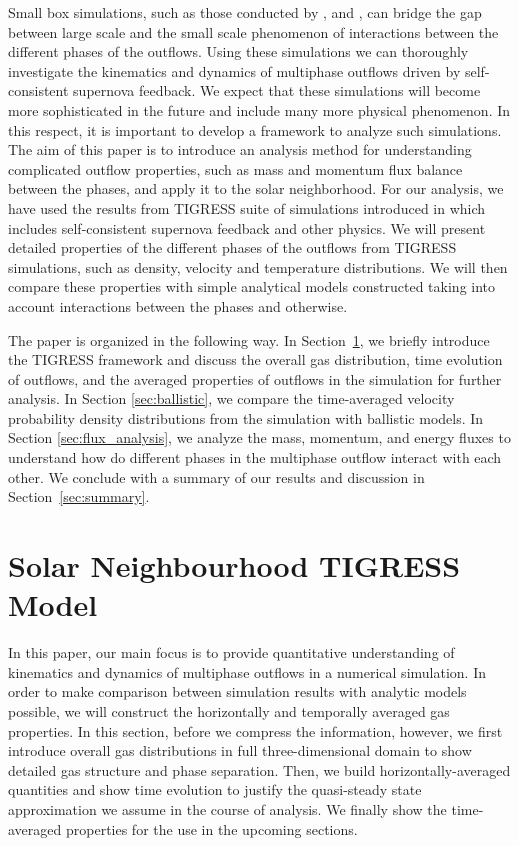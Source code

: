 \documentclass[twocolumn]{aastex62}
\begin{document}
Small box simulations, such as those conducted by \cite{Kim&Ostriker17}, \cite{ Gatto+17} and \cite{Iffrig&Hennebelle17}, can bridge the gap between large scale and the small scale phenomenon of interactions between the different phases of the outflows. Using these simulations we can thoroughly investigate the kinematics and dynamics of multiphase outflows driven by self-consistent supernova feedback. We expect that these simulations will become more sophisticated in the future and include many more physical phenomenon. In this respect, it is important to develop a framework to analyze such simulations. The aim of this paper is to introduce an analysis method for understanding complicated outflow properties, such as mass and momentum flux balance between the phases, and apply it to the solar neighborhood. For our analysis, we have used the results from  TIGRESS suite of simulations introduced in  \cite{Kim&Ostriker17} which includes self-consistent supernova feedback and other physics. We will present detailed properties of the different phases of the outflows from TIGRESS simulations, such as density, velocity and temperature distributions. We will then compare these properties with simple analytical models constructed taking into account interactions between the phases and otherwise.

The paper is organized in the following way. In Section~\ref{sec:tigress}, we briefly introduce the TIGRESS framework and discuss the overall gas distribution, time evolution of outflows, and the averaged properties of outflows in the simulation for further analysis. In Section \ref{sec:ballistic}, we compare the time-averaged velocity probability density distributions from the simulation with ballistic models. In Section \ref{sec:flux_analysis}, we analyze the mass, momentum, and energy fluxes to understand how do different phases in the multiphase outflow interact with each other. We conclude with a summary of our results and discussion in Section~\ref{sec:summary}.

\section{Solar Neighbourhood TIGRESS Model}\label{sec:tigress}

In this paper, our main focus is to provide quantitative understanding of kinematics and dynamics of multiphase outflows in a numerical simulation. In order to make comparison between simulation results with analytic models possible, we will construct the horizontally and temporally averaged gas properties. In this section, before we compress the information, however, we first introduce overall gas distributions in full three-dimensional domain to show detailed gas structure and phase separation. Then, we build horizontally-averaged quantities and show time evolution to justify the quasi-steady state approximation we assume in the course of analysis. We finally show the time-averaged properties for the use in the upcoming sections.
\end{document}
